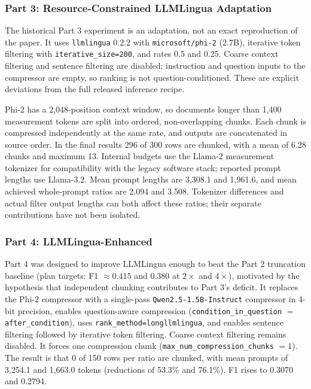 \documentclass[10pt,a4paper,twocolumn]{article}
\begin{document}
\subsubsection{Part 3: Resource-Constrained LLMLingua Adaptation}

The historical Part 3 experiment is an adaptation, not an exact reproduction
of the paper. It uses \texttt{llmlingua} 0.2.2 with
\texttt{microsoft/phi-2} (2.7B), iterative token filtering with
\texttt{iterative\_size=200}, and rates 0.5 and 0.25. Coarse context filtering
and sentence filtering are disabled; instruction and question inputs to the
compressor are empty, so ranking is not question-conditioned. These are explicit
deviations from the full released inference recipe.

Phi-2 has a 2{,}048-position context window, so documents longer than 1{,}400
measurement tokens are split into ordered, non-overlapping chunks. Each chunk
is compressed independently at the same rate, and outputs are concatenated in
source order. In the final results 296 of 300 rows are chunked, with a mean of
6.28 chunks and maximum 13. Internal budgets use the Llama-2 measurement
tokenizer for compatibility with the legacy software stack; reported prompt
lengths use Llama-3.2. Mean prompt lengths are 3{,}308.1 and 1{,}961.6, and
mean achieved whole-prompt ratios are 2.094 and 3.508. Tokenizer differences and
actual filter output lengths can both affect these ratios; their separate
contributions have not been isolated.

\subsubsection{Part 4: LLMLingua-Enhanced}

Part 4 was designed to improve LLMLingua enough to beat the Part 2 truncation baseline (plan targets: F1 $\approx 0.415$ and $0.380$ at $2\times$ and $4\times$), motivated by the hypothesis that independent chunking contributes to Part 3's deficit. It
replaces the Phi-2 compressor with a single-pass \texttt{Qwen2.5-1.5B-Instruct}
compressor in 4-bit precision, enables question-aware compression
(\texttt{condition\_in\_question} $=$ \texttt{after\_condition}), uses
\texttt{rank\_method=longllmlingua}, and enables sentence filtering followed by
iterative token filtering. Coarse context filtering remains disabled. It forces one compression chunk
(\texttt{max\_num\_compression\_chunks} $=1$). The result is that 0 of 150 rows
per ratio are chunked, with mean prompts of 3{,}254.1 and 1{,}663.0 tokens
(reductions of 53.3\% and 76.1\%). F1 rises to 0.3070 and 0.2794.
\end{document}
